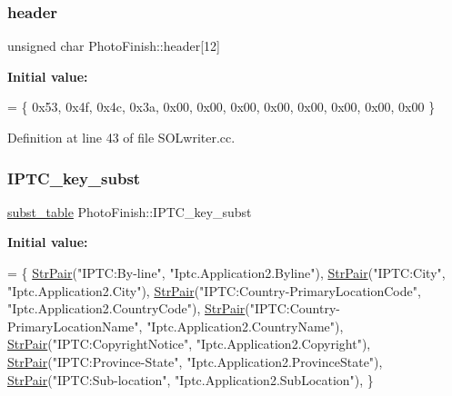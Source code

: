 \subsubsection{\texorpdfstring{header}{header}}
{\footnotesize\ttfamily unsigned char Photo\+Finish\+::header\mbox{[}12\mbox{]}}

{\bfseries Initial value\+:}
\begin{DoxyCode}
= \{ 0x53, 0x4f, 0x4c, 0x3a, 0x00, 0x00, 0x00, 0x00,
                               0x00, 0x00, 0x00, 0x00 \}
\end{DoxyCode}


Definition at line 43 of file S\+O\+Lwriter.\+cc.

\mbox{\label{namespace_photo_finish_a7197686a73deb3020e44cbb3f626bfc7}} 
\subsubsection{\texorpdfstring{I\+P\+T\+C\+\_\+key\+\_\+subst}{IPTC\_key\_subst}}
{\footnotesize\ttfamily \hyperlink{namespace_photo_finish_a99d3cfc086c8264e778255f5ef2b8b19}{subst\+\_\+table} Photo\+Finish\+::\+I\+P\+T\+C\+\_\+key\+\_\+subst}

{\bfseries Initial value\+:}
\begin{DoxyCode}
= \{
    \hyperlink{_tags_8hh_a19c06ce5d6cdc9b5a13fd3eae3dfa411}{StrPair}(\textcolor{stringliteral}{"IPTC:By-line"},                      \textcolor{stringliteral}{"Iptc.Application2.Byline"}),
    \hyperlink{_tags_8hh_a19c06ce5d6cdc9b5a13fd3eae3dfa411}{StrPair}(\textcolor{stringliteral}{"IPTC:City"},                 \textcolor{stringliteral}{"Iptc.Application2.City"}),
    \hyperlink{_tags_8hh_a19c06ce5d6cdc9b5a13fd3eae3dfa411}{StrPair}(\textcolor{stringliteral}{"IPTC:Country-PrimaryLocationCode"},  \textcolor{stringliteral}{"Iptc.Application2.CountryCode"}),
    \hyperlink{_tags_8hh_a19c06ce5d6cdc9b5a13fd3eae3dfa411}{StrPair}(\textcolor{stringliteral}{"IPTC:Country-PrimaryLocationName"},  \textcolor{stringliteral}{"Iptc.Application2.CountryName"}),
    \hyperlink{_tags_8hh_a19c06ce5d6cdc9b5a13fd3eae3dfa411}{StrPair}(\textcolor{stringliteral}{"IPTC:CopyrightNotice"},              \textcolor{stringliteral}{"Iptc.Application2.Copyright"}),
    \hyperlink{_tags_8hh_a19c06ce5d6cdc9b5a13fd3eae3dfa411}{StrPair}(\textcolor{stringliteral}{"IPTC:Province-State"},               \textcolor{stringliteral}{"Iptc.Application2.ProvinceState"}),
    \hyperlink{_tags_8hh_a19c06ce5d6cdc9b5a13fd3eae3dfa411}{StrPair}(\textcolor{stringliteral}{"IPTC:Sub-location"},         \textcolor{stringliteral}{"Iptc.Application2.SubLocation"}),
  \}
\end{DoxyCode}


